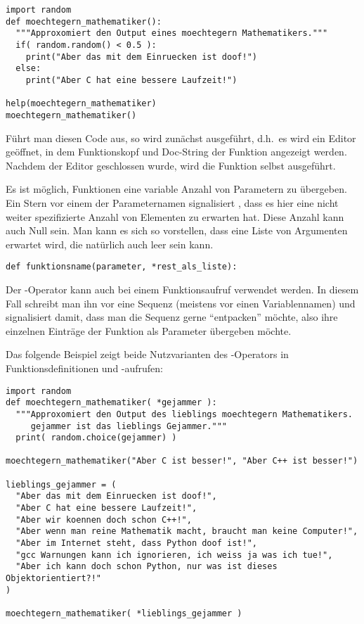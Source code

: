 \begin{lstlisting}
import random
def moechtegern_mathematiker():
  """Approxomiert den Output eines moechtegern Mathematikers."""
  if( random.random() < 0.5 ):
    print("Aber das mit dem Einruecken ist doof!")
  else:
    print("Aber C hat eine bessere Laufzeit!")

help(moechtegern_mathematiker)
moechtegern_mathematiker()
\end{lstlisting}

Führt man diesen Code aus, so wird zunächst  ausgeführt, d.h.\ es wird ein Editor 
geöffnet, in dem Funktionskopf und Doc-String der Funktion  angezeigt werden.
Nachdem der Editor geschlossen wurde, wird die Funktion selbst ausgeführt. 

Es ist möglich, Funktionen eine variable Anzahl von Parametern zu übergeben. Ein Stern vor einem der Parameternamen 
signalisiert \Python, dass es hier eine nicht weiter spezifizierte Anzahl von Elementen zu erwarten hat. Diese Anzahl kann 
auch Null sein. Man kann es sich so vorstellen, dass eine Liste von Argumenten erwartet wird, die natürlich auch leer sein 
kann. 

\begin{lstlisting}
def funktionsname(parameter, *rest_als_liste):
\end{lstlisting}

Der \lpy{*}-Operator kann auch bei einem Funktionsaufruf verwendet werden. In diesem Fall schreibt man ihn vor eine 
Sequenz (meistens vor einen Variablennamen) und signalisiert damit, dass man die Sequenz gerne ``entpacken'' möchte, 
also ihre einzelnen Einträge der Funktion als Parameter übergeben möchte.

Das folgende Beispiel zeigt beide Nutzvarianten des \lpy{*}-Operators in Funktionsdefinitionen und -aufrufen:

\begin{lstlisting}
import random
def moechtegern_mathematiker( *gejammer ):
  """Approxomiert den Output des lieblings moechtegern Mathematikers.
     gejammer ist das lieblings Gejammer."""
  print( random.choice(gejammer) )

moechtegern_mathematiker("Aber C ist besser!", "Aber C++ ist besser!")

lieblings_gejammer = (
  "Aber das mit dem Einruecken ist doof!",
  "Aber C hat eine bessere Laufzeit!",
  "Aber wir koennen doch schon C++!",
  "Aber wenn man reine Mathematik macht, braucht man keine Computer!",
  "Aber im Internet steht, dass Python doof ist!",
  "gcc Warnungen kann ich ignorieren, ich weiss ja was ich tue!",
  "Aber ich kann doch schon Python, nur was ist dieses Objektorientiert?!"
)

moechtegern_mathematiker( *lieblings_gejammer )
\end{lstlisting}

